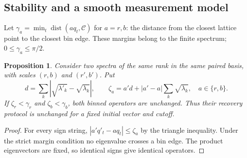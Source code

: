 \documentclass[11pt,a4paper]{article}
\newtheorem{proposition}{Proposition}
\begin{document}
\subsection{Stability and a smooth measurement model}
\label{sec:robustness}
Let $\gamma_a=\min_t\operatorname{dist}(a q_t,\mathcal C)$ for $a=r,b$: the distance from the closest lattice point to the closest bin edge. These margins belong to the finite spectrum; $0\le\gamma_a\le\pi/2$.
\begin{proposition}
\label{prop:margin}
Consider two spectra of the same rank in the same paired basis, with scales $(r,b)$ and $(r',b')$. Put
\begin{equation}
d=\sum_k|\sqrt{\lambda'_k}-\sqrt{\lambda_k}|,\qquad
\zeta_a=a'd+|a'-a|\sum_k\sqrt{\lambda_k},\quad a\in\{r,b\}.
\label{eq:margin}
\end{equation}
If $\zeta_r<\gamma_r$ and $\zeta_b<\gamma_b$, both binned operators are unchanged. Thus their recovery protocol is unchanged for a fixed initial vector and cutoff.
\end{proposition}
\begin{proof}
For every sign string, $|a'q'_t-aq_t|\le\zeta_a$ by the triangle inequality. Under the strict margin condition no eigenvalue crosses a bin edge. The product eigenvectors are fixed, so identical signs give identical operators.
\end{proof}
\end{document}
